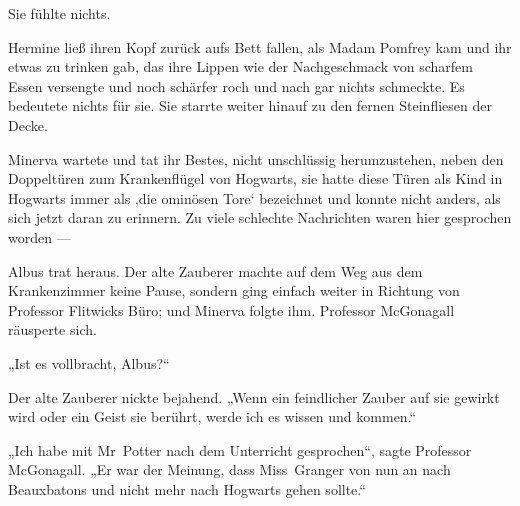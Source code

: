 Sie fühlte nichts.

Hermine ließ ihren Kopf zurück aufs Bett fallen, als Madam Pomfrey kam und ihr etwas zu trinken gab, das ihre Lippen wie der Nachgeschmack von scharfem Essen versengte und noch schärfer roch und nach gar nichts schmeckte.
Es bedeutete nichts für sie. Sie starrte weiter hinauf zu den fernen Steinfliesen der Decke.

\later

Minerva wartete und tat ihr Bestes, nicht unschlüssig herumzustehen, neben den Doppeltüren zum Krankenflügel von Hogwarts, sie hatte diese Türen als Kind in Hogwarts immer als ‚die ominösen Tore‘ bezeichnet und konnte nicht anders, als sich jetzt daran zu erinnern. Zu viele schlechte Nachrichten waren hier gesprochen worden —

Albus trat heraus. Der alte Zauberer machte auf dem Weg aus dem Krankenzimmer keine Pause, sondern ging einfach weiter in Richtung von Professor Flitwicks Büro; und Minerva folgte ihm. Professor McGonagall räusperte sich.

„Ist es vollbracht, Albus?“

Der alte Zauberer nickte bejahend.
„Wenn ein feindlicher Zauber auf sie gewirkt wird oder ein Geist sie berührt, werde ich es wissen und kommen.“

„Ich habe mit Mr~Potter nach dem Unterricht gesprochen“, sagte Professor McGonagall.
„Er war der Meinung, dass Miss~Granger von nun an nach Beauxbatons und nicht mehr nach Hogwarts gehen sollte.“

